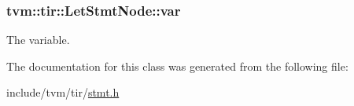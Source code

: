 \subsubsection[{\texorpdfstring{var}{var}}]{ tvm\+::tir\+::\+Let\+Stmt\+Node\+::var}\hypertarget{classtvm_1_1tir_1_1LetStmtNode_ae701bd89e0cafb77ae5f9eec127d1fe8}{}\label{classtvm_1_1tir_1_1LetStmtNode_ae701bd89e0cafb77ae5f9eec127d1fe8}


The variable. 



The documentation for this class was generated from the following file\+:\begin{DoxyCompactItemize}
\item 
include/tvm/tir/\hyperlink{stmt_8h}{stmt.\+h}\end{DoxyCompactItemize}
